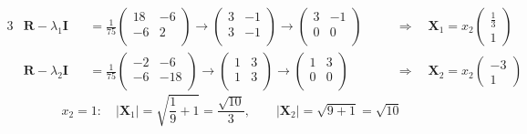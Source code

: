 \documentclass[12pt]{spbstu-task}
\begin{document}
\begin{alignat*}{3}
  &\mathbf{R} - \lambda_1\mathbf{I} &&= \frac{1}{75}\begin{pmatrix}
    18 & -6 \\
    -6 & 2 \\
  \end{pmatrix} \rightarrow \begin{pmatrix}
    3 & -1 \\
    3 & -1 \\
  \end{pmatrix} \rightarrow \begin{pmatrix}
    3 & -1 \\
    0 & 0 \\
  \end{pmatrix}\quad&&\Rightarrow\quad \mathbf{X}_1 = x_2\begin{pmatrix} \frac{1}{3} \\ 1 \end{pmatrix} \\
  &\mathbf{R} - \lambda_2\mathbf{I} &&= \frac{1}{75}\begin{pmatrix}
    -2 & -6 \\
    -6 & -18 \\
  \end{pmatrix} \rightarrow \begin{pmatrix}
    1 & 3 \\
    1 & 3 \\
  \end{pmatrix} \rightarrow \begin{pmatrix}
    1 & 3 \\
    0 & 0 \\
  \end{pmatrix}\quad&&\Rightarrow\quad \mathbf{X}_2 = x_2\begin{pmatrix} -3 \\ 1 \end{pmatrix}
\end{alignat*}
\begin{displaymath}
  x_2 = 1:\quad |\mathbf{X}_1| = \sqrt{\frac{1}{9} + 1} = \frac{\sqrt{10}}{3},\qquad |\mathbf{X}_2| = \sqrt{9 + 1} = \sqrt{10}
\end{displaymath}
\end{document}
